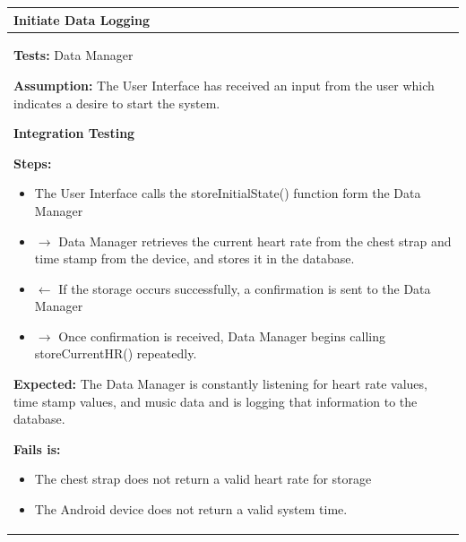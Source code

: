\documentclass[letterpaper,english, 12pt]{scrreprt}
\begin{document}
\begin{center}
         \begin{tabular}{|C{15cm}|}
                 \hline
                        \textbf{Initiate Data Logging} \\
                \hline
                        \begin{flushleft}
                                \textbf{Tests: } Data Manager
                        \end{flushleft}
                        \begin{flushleft}
                                \textbf{Assumption: } The User Interface has received an input from the user which indicates a desire to start the system.
                        \end{flushleft}
			\begin{center}
				\textbf{Integration Testing}
			\end{center}
                        \begin{flushleft}
                                \textbf{Steps: }
                        \end{flushleft}
                                \begin{itemize}
                                        \item The User Interface calls the storeInitialState() function form the Data Manager
                                        \item $\rightarrow$ Data Manager retrieves the current heart rate from the chest strap and time stamp from the device, and stores it in the database.
                                        \item $\leftarrow$ If the storage occurs successfully, a confirmation is sent to the Data Manager
                                        \item $\rightarrow$ Once confirmation is received, Data Manager begins calling storeCurrentHR() repeatedly.
                                \end{itemize}
                        \begin{flushleft}
                                \textbf{Expected: } The Data Manager is constantly listening for heart rate values, time stamp values, and music data and is logging that information to the database.
                        \end{flushleft}
                        \begin{flushleft}
                                \textbf{Fails is: }
                        \end{flushleft}
                                \begin{itemize}
                                        \item The chest strap does not return a valid heart rate for storage
                                        \item The Android device does not return a valid system time.
                                \end{itemize}\\
                \hline
        \end{tabular}
\end{center}
\end{document}
